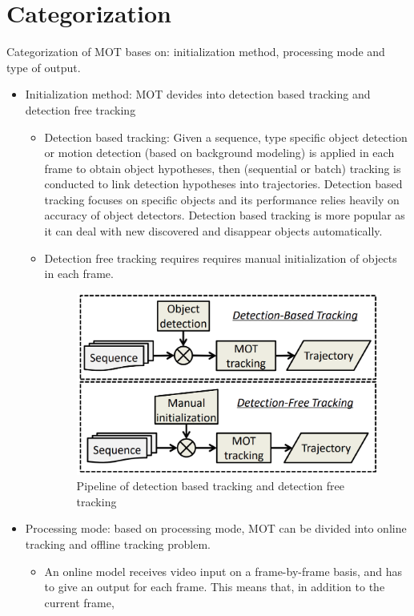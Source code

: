 \section{Categorization}
    Categorization of MOT bases on: initialization method, processing mode and type of output.
    \begin{itemize}
        \item Initialization method: MOT devides into detection based tracking and detection free tracking
            \begin{itemize}
                \item Detection based tracking: Given a sequence, type specific object detection or motion detection (based on background modeling) is applied in each frame 
                to obtain object hypotheses, then (sequential or batch) tracking is conducted to link detection hypotheses into trajectories. Detection based tracking focuses 
                on specific objects and its performance relies heavily on accuracy of object detectors. Detection based tracking is more popular as it can deal with new 
                discovered and disappear objects automatically.
                \item Detection free tracking requires requires manual initialization of objects in each frame.
                    \begin{figure}[H]
                        \centering
                        \includegraphics[width=0.6\linewidth]{img/MOT.png}
                        \caption{Pipeline of detection based tracking and detection free tracking}
                    \end{figure}
            \end{itemize}
        \item Processing mode: based on processing mode, MOT can be divided into online tracking and offline tracking problem. 
            \begin{itemize}
                \item An online model receives video input on a frame-by-frame basis, and has to give an output for each frame. This means that, in addition to the current frame, 

\end{itemize}
\end{itemize}
